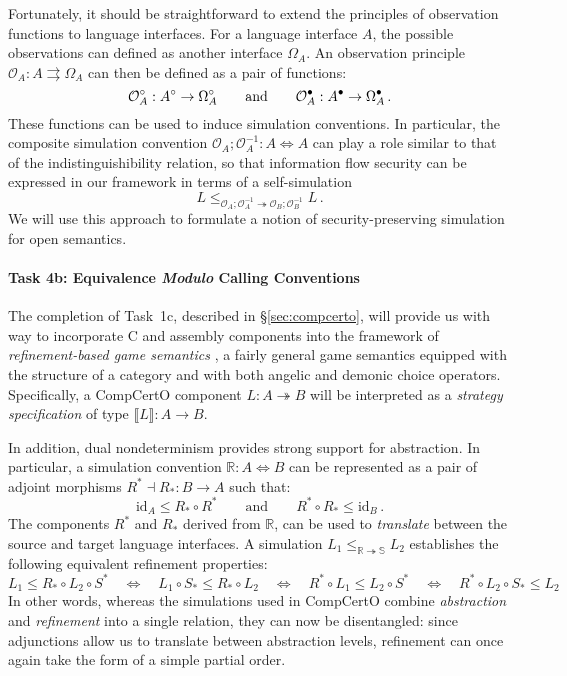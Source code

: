 Fortunately,
it should be straightforward to extend
the principles of observation functions to language interfaces.
For a language interface $A$,
the possible observations can defined as another interface $\Omega_A$.
An observation principle
$\mathcal{O}_A : A \rightrightarrows \Omega_A$
can then be defined as a pair of functions:
\[
  \mathcal{O}_A^\circ : A^\circ \rightarrow \Omega_A^\circ
  \qquad\text{and}\qquad
  \mathcal{O}_A^\bullet : A^\bullet \rightarrow \Omega_A^\bullet
  \,.
\]
These functions can be used to induce simulation conventions.
In particular,
the composite simulation convention
$
  \mathcal{O}_A \mathbin; \mathcal{O}_A^{-1} :
  A \Leftrightarrow A
$
can play a role similar to that of the indistinguishibility relation,
so that information flow security can be expressed
in our framework
in terms of a self-simulation
\[
  L \le_{\mathcal{O}_A \mathbin; \mathcal{O}_A^{-1} \twoheadrightarrow
         \mathcal{O}_B \mathbin; \mathcal{O}_B^{-1}} L
  \,.
\]
We will use this approach
to formulate a notion of security-preserving simulation
for open semantics.

\vspace*{-2ex}
\paragraph*{Task 4b: Equivalence \emph{Modulo} Calling Conventions}

The completion of Task~1c, described in \S\ref{sec:compcerto},
will provide us with way to incorporate C and assembly components
into the framework of \emph{refinement-based game semantics} \cite{koenig20},
a fairly general game semantics
equipped with the structure of a category
and with both angelic and demonic choice operators.
Specifically,
a CompCertO component $L : A \twoheadrightarrow B$
will be interpreted as a \emph{strategy specification} of type
$\llbracket L \rrbracket : A \rightarrow B$.

In addition, dual nondeterminism provides strong support for abstraction.
In particular,
a simulation convention $\mathbb{R} : A \Leftrightarrow B$
can be represented as a pair of adjoint morphisms
$R^* \dashv R_* : B \rightarrow A$
such that:
\[
  \mathrm{id}_A \le R_* \circ R^*
  \qquad \text{and} \qquad
  R^* \circ R_* \le \mathrm{id}_B
  \,.
\]
The components $R^*$ and $R_*$
derived from $\mathbb{R}$,
can be used
to \emph{translate} between the source and target language interfaces.
A simulation $L_1 \le_{\mathbb{R} \twoheadrightarrow \mathbb{S}} L_2$
establishes the following equivalent refinement properties:
\[
  L_1 \le R_* \circ L_2 \circ S^* \quad \Leftrightarrow \quad
  L_1 \circ S_* \le R_* \circ L_2 \quad \Leftrightarrow \quad
  R^* \circ L_1 \le L_2 \circ S^* \quad \Leftrightarrow \quad
  R^* \circ L_2 \circ S_* \le L_2
\]
In other words,
whereas the simulations used in CompCertO
combine \emph{abstraction} and \emph{refinement}
into a single relation,
they can now be disentangled:
since adjunctions allow us to translate between abstraction levels,
refinement can once again take the form of a simple partial order.

